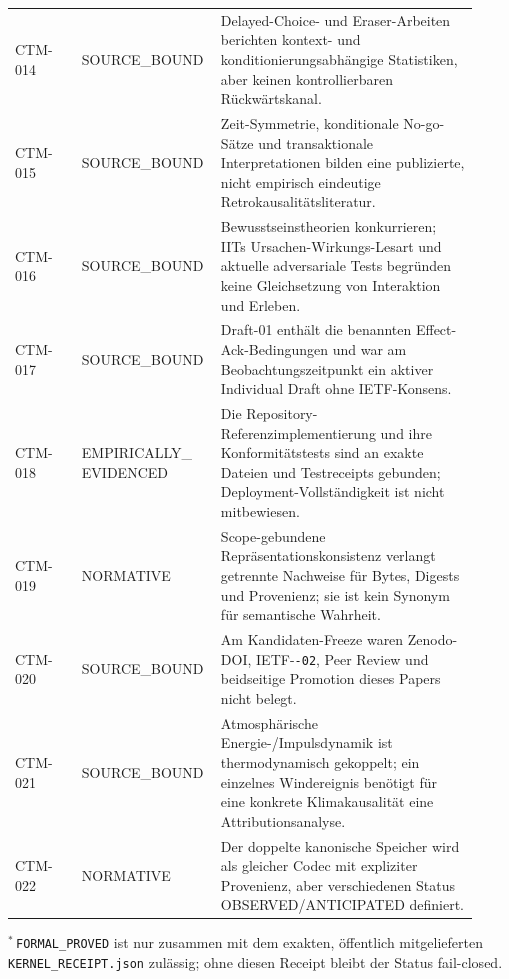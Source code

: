 \documentclass[11pt,a4paper]{article}
\theoremstyle{remark}
\begin{document}
\begin{longtable}{@{}p{0.14\linewidth}p{0.24\linewidth}p{0.54\linewidth}@{}}
CTM-014 & SOURCE\_BOUND &
Delayed-Choice- und Eraser-Arbeiten berichten kontext- und
konditionierungsabhängige Statistiken, aber keinen kontrollierbaren
Rückwärtskanal.\\
CTM-015 & SOURCE\_BOUND &
Zeit-Symmetrie, konditionale No-go-Sätze und transaktionale Interpretationen
bilden eine publizierte, nicht empirisch eindeutige Retrokausalitätsliteratur.\\
CTM-016 & SOURCE\_BOUND &
Bewusstseinstheorien konkurrieren; IITs Ursachen-Wirkungs-Lesart und aktuelle
adversariale Tests begründen keine Gleichsetzung von Interaktion und Erleben.\\
CTM-017 & SOURCE\_BOUND &
Draft-01 enthält die benannten Effect-Ack-Bedingungen und war am
Beobachtungszeitpunkt ein aktiver Individual Draft ohne IETF-Konsens.\\
CTM-018 & \shortstack[l]{EMPIRICALLY\_\\EVIDENCED} &
Die Repository-Referenzimplementierung und ihre Konformitätstests sind an
exakte Dateien und Testreceipts gebunden; Deployment-Vollständigkeit ist
nicht mitbewiesen.\\
CTM-019 & NORMATIVE &
Scope-gebundene Repräsentationskonsistenz verlangt getrennte Nachweise für
Bytes, Digests und Provenienz; sie ist kein Synonym für semantische Wahrheit.\\
CTM-020 & SOURCE\_BOUND &
Am Kandidaten-Freeze waren Zenodo-DOI, IETF-\texttt{-02}, Peer Review und
beidseitige Promotion dieses Papers nicht belegt.\\
CTM-021 & SOURCE\_BOUND &
Atmosphärische Energie-/Impulsdynamik ist thermodynamisch gekoppelt; ein
einzelnes Windereignis benötigt für eine konkrete Klimakausalität eine
Attributionsanalyse.\\
CTM-022 & NORMATIVE &
Der doppelte kanonische Speicher wird als gleicher Codec mit expliziter
Provenienz, aber verschiedenen Status \textsf{OBSERVED}/\textsf{ANTICIPATED}
definiert.\\
\bottomrule
\end{longtable}

\noindent\(^*\)\,\texttt{FORMAL\_PROVED} ist nur zusammen mit dem
exakten, öffentlich mitgelieferten \texttt{KERNEL\_RECEIPT.json} zulässig;
ohne diesen Receipt bleibt der Status fail-closed.
\end{document}

